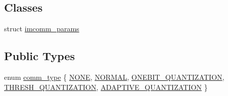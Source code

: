 \subsection*{Classes}
\begin{DoxyCompactItemize}
\item 
struct \hyperlink{structlbann_1_1lbann__callback__imcomm_1_1imcomm__params}{imcomm\+\_\+params}
\end{DoxyCompactItemize}
\subsection*{Public Types}
\begin{DoxyCompactItemize}
\item 
enum \hyperlink{classlbann_1_1lbann__callback__imcomm_acf7e894b3381e7f9b71020dc73594d6a}{comm\+\_\+type} \{ \newline
\hyperlink{classlbann_1_1lbann__callback__imcomm_acf7e894b3381e7f9b71020dc73594d6aafa59156bc4d5bcbf6bd80918d062da03}{N\+O\+NE}, 
\hyperlink{classlbann_1_1lbann__callback__imcomm_acf7e894b3381e7f9b71020dc73594d6aa5f19efb5bef79cea24be992a2137962e}{N\+O\+R\+M\+AL}, 
\hyperlink{classlbann_1_1lbann__callback__imcomm_acf7e894b3381e7f9b71020dc73594d6aa06f19090efbd982638c20bcb8a3c7d33}{O\+N\+E\+B\+I\+T\+\_\+\+Q\+U\+A\+N\+T\+I\+Z\+A\+T\+I\+ON}, 
\hyperlink{classlbann_1_1lbann__callback__imcomm_acf7e894b3381e7f9b71020dc73594d6aa76420a96a3df1d5b60140bab6bc32dc4}{T\+H\+R\+E\+S\+H\+\_\+\+Q\+U\+A\+N\+T\+I\+Z\+A\+T\+I\+ON}, 
\newline
\hyperlink{classlbann_1_1lbann__callback__imcomm_acf7e894b3381e7f9b71020dc73594d6aaeb95973ab89fc579b91554cd783031b7}{A\+D\+A\+P\+T\+I\+V\+E\+\_\+\+Q\+U\+A\+N\+T\+I\+Z\+A\+T\+I\+ON}
 \}
\end{DoxyCompactItemize}
